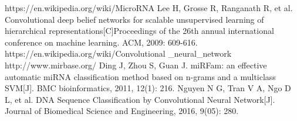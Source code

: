 \documentclass[letterpaper, 11pt]{article}
\begin{document}
\newpage
\begin{multicols*}{2}

\begin{thebibliography}{1}
https://en.wikipedia.org/wiki/MicroRNA 
Lee H, Grosse R, Ranganath R, et al. Convolutional deep belief networks for scalable unsupervised learning of hierarchical representations[C]Proceedings of the 26th annual international conference on machine learning. ACM, 2009: 609-616. 
https://en.wikipedia.org/wiki/Convolutional
\_neural\_network
http://www.mirbase.org/
Ding J, Zhou S, Guan J. miRFam: an effective automatic miRNA classification method based on n-grams and a multiclass SVM[J]. BMC bioinformatics, 2011, 12(1): 216.
Nguyen N G, Tran V A, Ngo D L, et al. DNA Sequence Classification by Convolutional Neural Network[J]. Journal of Biomedical Science and Engineering, 2016, 9(05): 280.
\end{thebibliography}

\end{multicols*}
\end{document}
